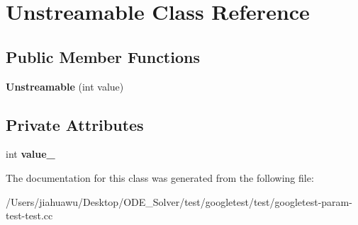 \hypertarget{class_unstreamable}{}\section{Unstreamable Class Reference}
\label{class_unstreamable}
\subsection*{Public Member Functions}
\begin{DoxyCompactItemize}
\item 
\mbox{\label{class_unstreamable_aec8af0d0f78468a9094f1b36332a0842}} 
{\bfseries Unstreamable} (int value)
\end{DoxyCompactItemize}
\subsection*{Private Attributes}
\begin{DoxyCompactItemize}
\item 
\mbox{\label{class_unstreamable_a3b4a3b4fd9c1999f38b3c63b7de0fa07}} 
int {\bfseries value\+\_\+}
\end{DoxyCompactItemize}


The documentation for this class was generated from the following file\+:\begin{DoxyCompactItemize}
\item 
/\+Users/jiahuawu/\+Desktop/\+O\+D\+E\+\_\+\+Solver/test/googletest/test/googletest-\/param-\/test-\/test.\+cc\end{DoxyCompactItemize}
